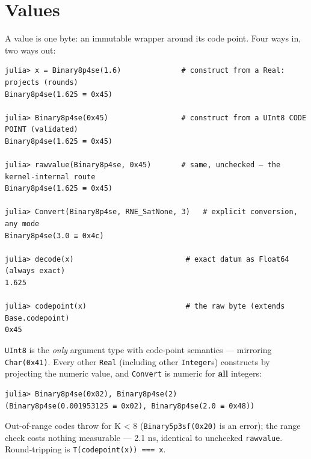\section{Values}



\label{18067454253769209299}{}


A value is one byte: an immutable wrapper around its code point. Four ways in, two ways out:




\begin{verbatim}
julia> x = Binary8p4se(1.6)              # construct from a Real: projects (rounds)
Binary8p4se(1.625 ≡ 0x45)

julia> Binary8p4se(0x45)                 # construct from a UInt8 CODE POINT (validated)
Binary8p4se(1.625 ≡ 0x45)

julia> rawvalue(Binary8p4se, 0x45)       # same, unchecked — the kernel-internal route
Binary8p4se(1.625 ≡ 0x45)

julia> Convert(Binary8p4se, RNE_SatNone, 3)   # explicit conversion, any mode
Binary8p4se(3.0 ≡ 0x4c)

julia> decode(x)                          # exact datum as Float64 (always exact)
1.625

julia> codepoint(x)                       # the raw byte (extends Base.codepoint)
0x45
\end{verbatim}



\begin{tcolorbox}[toptitle=-1mm,bottomtitle=1mm,colback=admonition-note!50!white,colframe=admonition-note,title=\textbf{UInt8 means code point; every other number means value}]
\texttt{UInt8} is the \emph{only} argument type with code-point semantics — mirroring \texttt{Char(0x41)}. Every other \texttt{Real} (including other \texttt{Integer}s) constructs by projecting the numeric value, and \texttt{Convert} is numeric for \textbf{all} integers:


\begin{verbatim}
julia> Binary8p4se(0x02), Binary8p4se(2)
(Binary8p4se(0.001953125 ≡ 0x02), Binary8p4se(2.0 ≡ 0x48))
\end{verbatim}

Out-of-range codes throw for K < 8 (\texttt{Binary5p3sf(0x20)} is an error); the range check costs nothing measurable — 2.1 ns, identical to unchecked \texttt{rawvalue}. Round-tripping is \texttt{T(codepoint(x)) === x}.

\end{tcolorbox}


